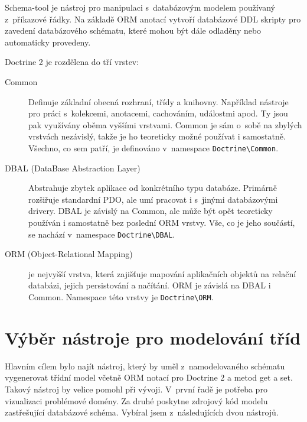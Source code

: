 \documentclass[thesis=B,czech]{FITthesis}[2012/06/26]
\begin{document}
	Schema-tool je nástroj pro manipulaci s~databázovým modelem používaný z~příkazové řádky. Na základě ORM anotací vytvoří databázové DDL skripty pro zavedení databázového schématu, které mohou být dále odladěny nebo automaticky provedeny.
	
	Doctrine 2 je rozdělena do tří vrstev:
	\begin{description}
		\item[Common] Definuje základní obecná rozhraní, třídy a knihovny. Například nástroje pro práci s~kolekcemi, anotacemi, cachováním, událostmi apod. Ty jsou pak využívány oběma vyššími vrstvami. Common je sám o~sobě na zbylých vrstvách nezávislý, takže je ho teoreticky možné používat i samostatně. Všechno, co sem patří, je definováno v~namespace \verb|Doctrine\Common|.
		\item[DBAL (DataBase Abstraction Layer)] Abstrahuje zbytek aplikace od konkrétního typu databáze. Primárně rozšiřuje standardní PDO, ale umí pracovat i s~jinými databázovými drivery. DBAL je závislý na Common, ale může být opět teoreticky používán i samostatně bez poslední ORM vrstvy. Vše, co je jeho součástí, se nachází v~namespace \verb|Doctrine\DBAL|.
		\item[ORM (Object-Relational Mapping)] je nejvyšší vrstva, která zajišťuje mapování aplikačních objektů na relační databázi, jejich persistování a načítání. ORM je závislá na DBAL i Common. Namespace této vrstvy je \verb|Doctrine\ORM|.\cite{doctrine2}
	\end{description}

\section{Výběr nástroje pro modelování tříd}
	Hlavním cílem bylo najít nástroj, který by uměl z~namodelovaného schématu vygenerovat třídní model včetně ORM notací pro Doctrine 2 a metod get a set. Takový nástroj by velice pomohl při vývoji. V~první řadě je potřeba pro vizualizaci problémové domény. Za druhé poskytne zdrojový kód modelu zastřešující databázové schéma. Vybíral jsem z~následujících dvou nástrojů.
\end{document}
